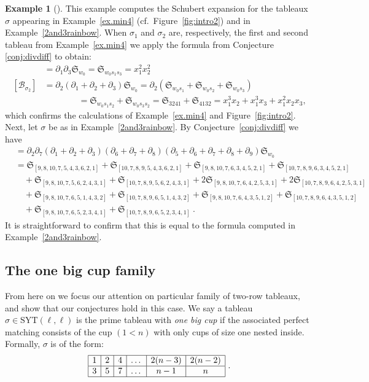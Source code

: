 \documentclass[11pt]{amsart}
\theoremstyle{remark}
\theoremstyle{remark}
\theoremstyle{definition}
\theoremstyle{definition}
\theoremstyle{definition}
\newtheorem{eg_no_qed}[theorem]{Example}
\newenvironment{ex}[1][]{\begin{eg_no_qed}[#1]\renewcommand{\qedsymbol}{$\Diamond$}\pushQED{\qed}}{\popQED\end{eg_no_qed}}
\numberwithin{equation}{section}
\newcommand{\gs}{\sigma}
\newcommand{\cb}{\mathcal{B}}
\newcommand{\SYT}{\mathrm{SYT}}
\begin{document}
\begin{ex} This example computes the Schubert expansion for the tableaux $\gs$ appearing in Example~\ref{ex.min4} (cf.~Figure~\ref{fig:intro2}) and in Example~\ref{2and3rainbow}. When $\sigma_1$ and $\sigma_2$ are, respectively, the first and second tableau from Example~\ref{ex.min4} we apply the formula from Conjecture \ref{conj:divdiff} to obtain:
\begin{align*}
[\cb_{\gs_1}]&=\partial_1\partial_3\mathfrak{S}_{w_0} = \mathfrak{S}_{w_0s_1s_3} =x_1^2x_2^2 \\
[\cb_{\gs_2}]&= \partial_2(\partial_1+\partial_2+\partial_3)\mathfrak{S}_{w_0}=\partial_2(\mathfrak{S}_{w_0s_1} + \mathfrak{S}_{w_0s_2}+\mathfrak{S}_{w_0s_3}) \\
&\qquad \qquad = \mathfrak{S}_{w_0s_1s_2}+ \mathfrak{S}_{w_0s_3s_2} =  \mathfrak{S}_{3241}+\mathfrak{S}_{4132} = x_1^3x_2+x_1^3x_3+x_1^2x_2x_3,
\end{align*}
which confirms the calculations of Example~\ref{ex.min4} and Figure~\ref{fig:intro2}. Next, let $\gs$ be as in Example~\ref{2and3rainbow}. By Conjecture~\ref{conj:divdiff} we have 
\begin{align*}
[\cb_\gs]&=\partial_2\partial_7(\partial_1+\partial_2+\partial_3)(\partial_6+\partial_7+\partial_8) (\partial_5+\partial_6+\partial_7+\partial_8+\partial_9)\mathfrak{S}_{w_0}\\
&=\mathfrak{S}_{[9,8,10,7,5,4,3,6,2,1]}+ \mathfrak{S}_{[10,7,8,9,5,4,3,6,2,1]}+ \mathfrak{S}_{[9,8,10,7,6,3,4,5,2,1]}+ \mathfrak{S}_{[10,7,8,9,6,3,4,5,2,1]}\\
&\quad +\mathfrak{S}_{[9,8,10,7,5,6,2,4,3,1]}+ \mathfrak{S}_{[10,7,8,9,5,6,2,4,3,1]}+ 2\mathfrak{S}_{[9,8,10,7,6,4,2,5,3,1]}+ 2\mathfrak{S}_{[10,7,8,9,6,4,2,5,3,1]}\\
&\quad+\mathfrak{S}_{[9,8,10,7,6,5,1,4,3,2]} +\mathfrak{S}_{[10,7,8,9,6,5,1,4,3,2]}+\mathfrak{S}_{[9,8,10,7,6,4,3,5,1,2]} +\mathfrak{S}_{[10,7,8,9,6,4,3,5,1,2]}\\
& \quad+\mathfrak{S}_{[9,8,10,7,6,5,2,3,4,1]}+\mathfrak{S}_{[10,7,8,9,6,5,2,3,4,1]}\ . 
\end{align*}
It is straightforward to confirm that this is equal to the formula computed in Example~\ref{2and3rainbow}.
\end{ex}



\subsection{The one big cup family}
From here on we focus our attention on particular family of two-row tableaux, and show that our conjectures hold in this case. We say a tableau $\gs\in \SYT(\ell, \ell)$ is the prime tableau with \emph{one big cup} if the associated perfect matching consists of the cup $(1<n)$ with only cups of size one nested inside. Formally, $\gs$ is of the form:
\[
\begin{array}{|c|c|c|c|c|c|}
\hline
1 & 2 & 4 & \dots & 2(n-3) & 2(n-2) \\ \hline
3 & 5 & 7 & \dots & n-1 & n \\ \hline 
\end{array} \ .
\]
\end{document}

